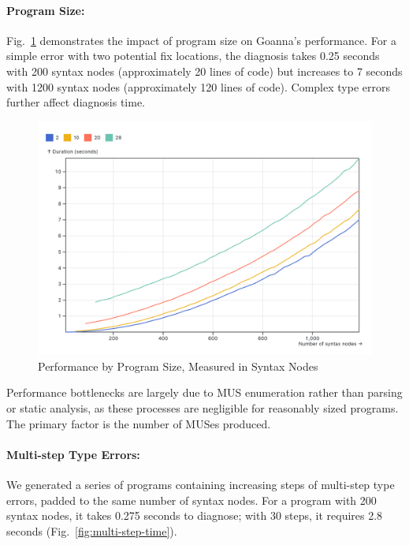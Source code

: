 \documentclass[pdflatex,sn-mathphys-num]{sn-jnl}%
\begin{document}
\paragraph{Program Size:} Fig.~\ref{fig:node-size} demonstrates the impact of program size on Goanna's performance. For a simple error with two potential fix locations, the diagnosis takes 0.25 seconds with 200 syntax nodes (approximately 20 lines of code) but increases to 7 seconds with 1200 syntax nodes (approximately 120 lines of code). Complex type errors further affect diagnosis time.

\begin{figure}[ht]
    \centering
    \includegraphics[width=0.8\linewidth]{images/program-size.png}
    \caption{Performance by Program Size, Measured in Syntax Nodes}
    \label{fig:node-size}
\end{figure}

Performance bottlenecks are largely due to MUS enumeration rather than parsing or static analysis, as these processes are negligible for reasonably sized programs. The primary factor is the number of MUSes produced.

\paragraph{Multi-step Type Errors:} We generated a series of programs containing increasing steps of multi-step type errors, padded to the same number of syntax nodes. For a program with 200 syntax nodes, it takes 0.275 seconds to diagnose; with 30 steps, it requires 2.8 seconds (Fig.~\ref{fig:multi-step-time}).
\end{document}
